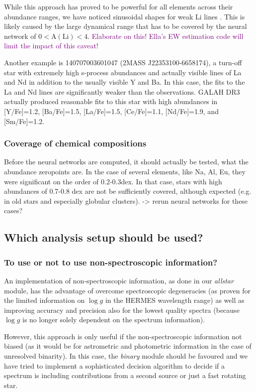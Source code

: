 \documentclass[
  journal=pasa,
  manuscript=research-paper, %
  year=2023,
  volume=37
]{cup-journal}
\newcommand{\SB}[1]{{\textcolor{purple}{#1}}}
\newcommand{\logg}{$\log g$\xspace}
\begin{document}
While this approach has proved to be powerful for all elements across their abundance ranges, we have noticed sinusoidal shapes for weak Li lines \citep[see also][]{Wang2020}. This is likely caused by the large dynamical range that has to be covered by the neural network of $0 < \mathrm{A(Li)} < 4$. \SB{Elaborate on this! Ella's EW estimation code will limit the impact of this caveat!}

Another example is 140707003601047 (2MASS J22353100-6658174), a turn-off star with extremely high s-process abundances and actually visible lines of La and Nd in addition to the usually visible Y and Ba. In this case, the fits to the La and Nd lines are significantly weaker than the observations. GALAH DR3 actually produced reasonable fits to this star with high abundances in [Y/Fe]=1.2, [Ba/Fe]=1.5, [La/Fe]=1.5, [Ce/Fe]=1.1, [Nd/Fe]=1.9, and [Sm/Fe]=1.2.

\subsubsection{Coverage of chemical compositions}

Before the neural networks are computed, it should actually be tested, what the abundance zeropoints are. In the case of several elements, like Na, Al, Eu, they were significant on the order of 0.2-0.3dex. In that case, stars with high abundances of 0.7-0.8 dex are not be sufficiently covered, although expected (e.g. in old stars and especially globular clusters). -> rerun neural networks for these cases?

\subsection{Which analysis setup should be used?}

\subsubsection{To use or not to use non-spectroscopic information?}

An implementation of non-spectroscopic information, as done in our \textit{allstar} module, has the advantage of overcome spectroscopic degeneracies (as proven for the limited information on \logg in the HERMES wavelength range) as well as improving accuracy and precision also for the lowest quality spectra (because \logg is no longer solely dependent on the spectrum information).

However, this approach is only useful if the non-spectroscopic information not biased (as it would be for astrometric and photometric information in the case of unresolved binarity). In this case, the \textit{binary} module should be favoured and we have tried to implement a sophisticated decision algorithm to decide if a spectrum is including contributions from a second source or just a fast rotating star.
\end{document}
